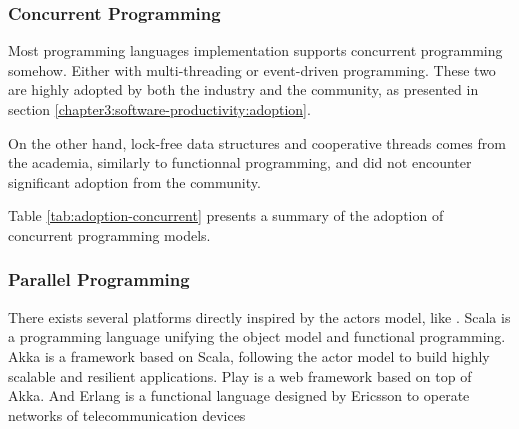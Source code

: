 

\subsubsection{Concurrent Programming}

Most programming languages implementation supports concurrent programming somehow.
Either with multi-threading or event-driven programming.
These two are highly adopted by both the industry and the community, as presented in section \ref{chapter3:software-productivity:adoption}.

On the other hand, lock-free data structures and cooperative threads comes from the academia, similarly to functionnal programming, and did not encounter significant adoption from the community.

Table \ref{tab:adoption-concurrent} presents a summary of the adoption of concurrent programming models.


\subsubsection{Parallel Programming}

There exists several platforms directly inspired by the actors model, like .
Scala is a programming language unifying the object model and functional programming.
Akka is a framework based on Scala, following the actor model to build highly scalable and resilient applications.
Play is a web framework based on top of Akka.
And Erlang is a functional language designed by Ericsson to operate networks of telecommunication devices \cite{Armstrong1993,Nelson2004,Armstrong2014}

